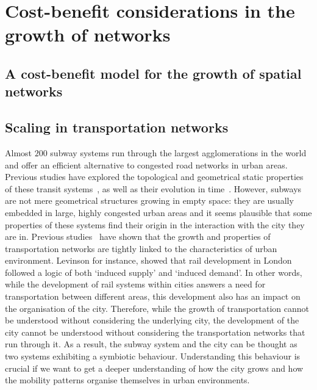 \chapter{Cost-benefit considerations in the growth of networks}
\label{chap:cost-benefit}

\section{A cost-benefit model for the growth of spatial networks}
\label{sec:a_cost_benefit_model_for_the_growth_of_spatial_networks}

\section{Scaling in transportation networks}
\label{sec:scaling_in_transportation_networks}


Almost $200$ subway systems run through the largest agglomerations in the world
and offer an efficient alternative to congested road networks in urban areas.
Previous studies have explored the topological and geometrical static properties
of these transit systems~\cite{Derrible:2009,Levinson:2012}, as well as their
evolution in time~\cite{Roth:2012}. However, subways are not mere geometrical
structures growing in empty space: they are usually embedded in large, highly
congested urban areas and it seems plausible that some properties of these
systems find their origin in the interaction with the city they are in. Previous
studies~\cite{Levinson:2008,Xie:2009} have shown that the growth and properties
of transportation networks are tightly linked to the characteristics of urban
environment. Levinson \cite{Levinson:2008} for instance, showed that rail
development in London followed a logic of both `induced supply' and `induced
demand'. In other words, while the development of rail systems within cities
answers a need for transportation between different areas, this development also
has an impact on the organisation of the city. Therefore, while the growth of
transportation cannot be understood without considering the underlying city, the
development of the city cannot be understood without considering the
transportation networks that run through it. As a result, the subway system and
the city can be thought as two systems exhibiting a symbiotic behaviour.
Understanding this behaviour is crucial if we want to get a deeper understanding
of how the city grows and how the mobility patterns organise themselves in urban
environments.

